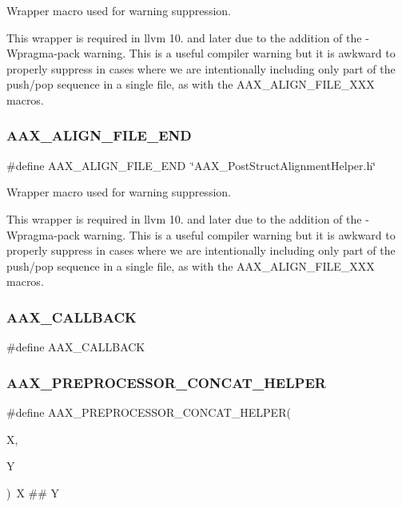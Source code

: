 Wrapper macro used for warning suppression. 

This wrapper is required in llvm 10. and later due to the addition of the {\ttfamily -\/Wpragma-\/pack} warning. This is a useful compiler warning but it is awkward to properly suppress in cases where we are intentionally including only part of the push/pop sequence in a single file, as with the {\ttfamily A\+A\+X\+\_\+\+A\+L\+I\+G\+N\+\_\+\+F\+I\+L\+E\+\_\+\+X\+XX} macros. \mbox{\label{a00392_a4343a2f7a4030576d290bc2c127964d8}} 
\subsubsection{\texorpdfstring{AAX\_ALIGN\_FILE\_END}{AAX\_ALIGN\_FILE\_END}}
{\footnotesize\ttfamily \#define A\+A\+X\+\_\+\+A\+L\+I\+G\+N\+\_\+\+F\+I\+L\+E\+\_\+\+E\+ND~\char`\"{}A\+A\+X\+\_\+\+Post\+Struct\+Alignment\+Helper.\+h\char`\"{}}



Wrapper macro used for warning suppression. 

This wrapper is required in llvm 10. and later due to the addition of the {\ttfamily -\/Wpragma-\/pack} warning. This is a useful compiler warning but it is awkward to properly suppress in cases where we are intentionally including only part of the push/pop sequence in a single file, as with the {\ttfamily A\+A\+X\+\_\+\+A\+L\+I\+G\+N\+\_\+\+F\+I\+L\+E\+\_\+\+X\+XX} macros. \mbox{\label{a00392_aaa22112139aa627574b1ef562f579d43}} 
\subsubsection{\texorpdfstring{AAX\_CALLBACK}{AAX\_CALLBACK}}
{\footnotesize\ttfamily \#define A\+A\+X\+\_\+\+C\+A\+L\+L\+B\+A\+CK}

\mbox{\label{a00392_ab4f95cd2e83b3c871f47c24a4fbaae7a}} 
\subsubsection{\texorpdfstring{AAX\_PREPROCESSOR\_CONCAT\_HELPER}{AAX\_PREPROCESSOR\_CONCAT\_HELPER}}
{\footnotesize\ttfamily \#define A\+A\+X\+\_\+\+P\+R\+E\+P\+R\+O\+C\+E\+S\+S\+O\+R\+\_\+\+C\+O\+N\+C\+A\+T\+\_\+\+H\+E\+L\+P\+ER(\begin{DoxyParamCaption}\item[{}]{X,  }\item[{}]{Y }\end{DoxyParamCaption})~X \#\# Y}

